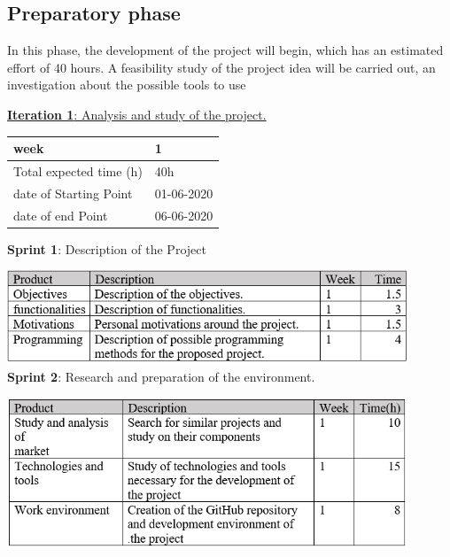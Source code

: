 \subsection{Preparatory phase}
In this phase, the development of the project will begin, which has an estimated effort of 40 hours. A feasibility study of the project idea will be carried out, an investigation about the possible tools to use


\large{\underline{\textbf{Iteration 1}: Analysis and study of the project.}}
\vspace{0.3cm}
\begin{table}[h!]
    \centering
    \begin{tabular}{|p{5cm}|p{4cm}|}
     \hline
        \cellcolor[gray]{0.9} week  & 1\\ \hline
        \cellcolor[gray]{0.9} Total expected time (h)  & 40h \\ \hline
        \cellcolor[gray]{0.9} date of Starting Point  & 01-06-2020 \\ \hline
        \cellcolor[gray]{0.9} date of end Point  & 06-06-2020 \\ \hline
            
\end{tabular}
\end{table}

\textbf{Sprint 1}: Description of the Project

\includegraphics[width=0.9\textwidth]{imagenes/it1sp1.png}\\[1.4cm]
\textbf{Sprint 2}: Research and preparation of the environment.

\includegraphics[width=0.9\textwidth]{imagenes/it1sp2.png}\\[1.4cm]

